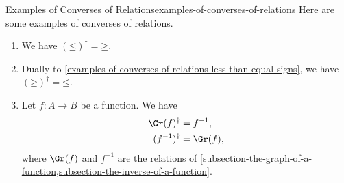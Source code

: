 \begin{example}{Examples of Converses of Relations}{examples-of-converses-of-relations}%
    Here are some examples of converses of relations.
    \begin{enumerate}
        \item\label{examples-of-converses-of-relations-less-than-equal-signs}We have $(\mathord{\leq})^{\dagger}=\mathord{\geq}$.
        \item\label{examples-of-converses-of-relations-greater-than-equal-signs}Dually to \cref{examples-of-converses-of-relations-less-than-equal-signs}, we have $(\mathord{\geq})^{\dagger}=\mathord{\leq}$.
        \item\label{examples-of-converses-of-relations-functions}Let $f\colon A\to B$ be a function. We have
            \begin{align*}
                \Gr(f)^{\dagger}   &= f^{-1},\\
                (f^{-1})^{\dagger} &= \Gr(f),
            \end{align*}
            where $\Gr(f)$ and $f^{-1}$ are the relations of \cref{subsection-the-graph-of-a-function,subsection-the-inverse-of-a-function}.
    \end{enumerate}
\end{example}
